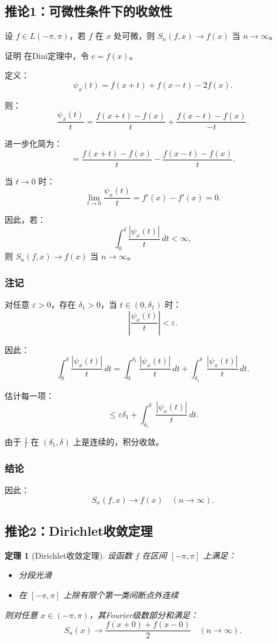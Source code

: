 \documentclass[12pt]{article}
\newtheorem{theorem}{定理}  %
\begin{document}
	\subsection{推论1：可微性条件下的收敛性}
	
	设 \( f \in L(-\pi, \pi) \)，若 \( f \) 在 \( x \) 处可微，则 \( S_n(f, x) \to f(x) \) 当 \( n \to \infty \)。
	
证明
	在Dini定理中，令 \( c = f(x) \)。
	
	定义：
	\[
	\psi_x(t) = f(x+t) + f(x-t) - 2f(x).
	\]
	
	则：
	\[
	\frac{\psi_x(t)}{t} = \frac{f(x+t) - f(x)}{t} + \frac{f(x-t) - f(x)}{-t}.
	\]
	
	进一步化简为：
	\[
	= \frac{f(x+t) - f(x)}{t} - \frac{f(x-t) - f(x)}{t}.
	\]
	
	当 \( t \to 0 \) 时：
	\[
	\lim_{t \to 0} \frac{\psi_x(t)}{t} = f'(x) - f'(x) = 0.
	\]
	
	因此，若：
	\[
	\int_0^\delta \frac{|\psi_x(t)|}{t} \, dt < \infty,
	\]
	则 \( S_n(f, x) \to f(x) \) 当 \( n \to \infty \)。
	
	\subsubsection{注记}
	
	对任意 \(\varepsilon > 0\)，存在 \(\delta_1 > 0\)，当 \( t \in (0, \delta_1) \) 时：
	\[
	\left| \frac{\psi_x(t)}{t} \right| < \varepsilon.
	\]
	
	因此：
	\[
	\int_0^\delta \frac{|\psi_x(t)|}{t} \, dt = \int_0^{\delta_1} \frac{|\psi_x(t)|}{t} \, dt + \int_{\delta_1}^\delta \frac{|\psi_x(t)|}{t} \, dt.
	\]
	
	估计每一项：
	\[
	\leq \varepsilon \delta_1 + \int_{\delta_1}^\delta \frac{|\psi_x(t)|}{t} \, dt.
	\]
	
	由于 \(\frac{1}{t}\) 在 \((\delta_1, \delta)\) 上是连续的，积分收敛。
	
\subsubsection{结论}
	
	因此：
	\[
	S_n(f, x) \to f(x) \quad (n \to \infty).
	\]
	
		\subsection{推论2：Dirichlet收敛定理}
	
	
	\begin{theorem}[Dirichlet收敛定理]
		设函数 $f$ 在区间 $[-\pi, \pi]$ 上满足：
		\begin{itemize}
			\item 分段光滑
			\item 在 $[-\pi, \pi]$ 上除有限个第一类间断点外连续
		\end{itemize}
		则对任意 $x \in (-\pi, \pi)$，其Fourier级数部分和满足：
		\[
		S_n(x) \to \frac{f(x+0) + f(x-0)}{2} \quad (n \to \infty).
		\]
	\end{theorem}
	
\end{document}
